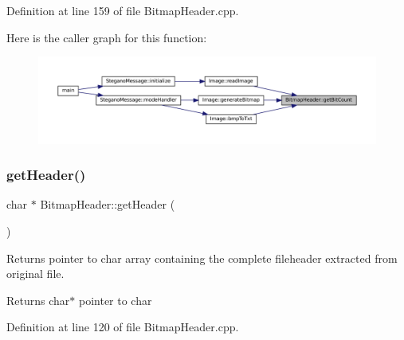 Definition at line 159 of file Bitmap\+Header.\+cpp.

Here is the caller graph for this function\+:
\nopagebreak
\begin{figure}[H]
\begin{center}
\leavevmode
\includegraphics[width=350pt]{classBitmapHeader_a2660782990f1d9547e0aef501f666969_icgraph}
\end{center}
\end{figure}
\mbox{\label{classBitmapHeader_aa29e1acc8a7a588867039d7c0bdcde04}} 
\subsubsection{\texorpdfstring{getHeader()}{getHeader()}}
{\footnotesize\ttfamily char $\ast$ Bitmap\+Header\+::get\+Header (\begin{DoxyParamCaption}{ }\end{DoxyParamCaption})}



Returns pointer to char array containing the complete fileheader extracted from original file. 

\begin{DoxyReturn}{Returns}
char$\ast$ pointer to char 
\end{DoxyReturn}


Definition at line 120 of file Bitmap\+Header.\+cpp.

